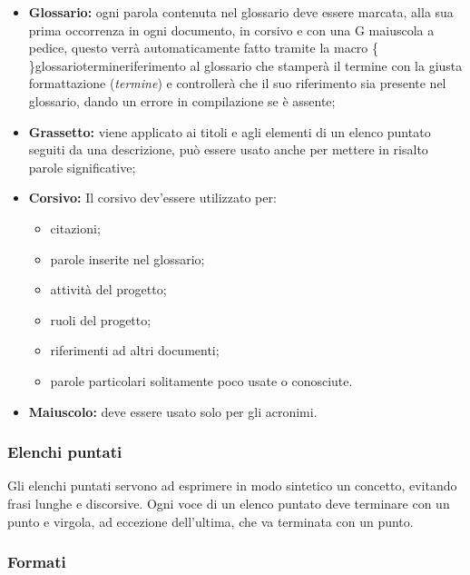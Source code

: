 \documentclass[../NormediProgetto.tex]{subfiles}
\begin{document}
\begin{itemize}

\item{\textbf{Glossario:}} ogni parola contenuta nel glossario deve essere marcata, alla sua prima occorrenza in ogni documento, in corsivo e con una G maiuscola a pedice, questo verrà automaticamente fatto tramite la macro \{ \}glossario{termine}{riferimento al glossario} che stamperà il termine con la giusta formattazione (\textit{termine}) e controllerà che il suo riferimento sia presente nel glossario, dando un errore in compilazione se è assente;  

\item{\textbf{Grassetto:}} viene applicato ai titoli e agli elementi di un elenco puntato seguiti da una descrizione, può essere usato anche per mettere in risalto parole significative; 

\item{\textbf{Corsivo:}} Il corsivo dev’essere utilizzato per:
\begin{itemize}
\item citazioni;
\item parole inserite nel glossario;
\item attività del progetto;
\item ruoli del progetto;
\item riferimenti ad altri documenti;
\item parole particolari solitamente poco usate o conosciute.
\end{itemize}

\item{\textbf{Maiuscolo:}} deve essere usato solo per gli acronimi.

\end{itemize}

\subsubsection{Elenchi puntati}

 Gli elenchi puntati servono ad esprimere in modo sintetico un concetto, evitando frasi lunghe e discorsive. Ogni voce di un elenco puntato deve terminare con un punto e virgola, ad eccezione dell’ultima, che va terminata con un punto.

\subsubsection{Formati}
\end{document}
